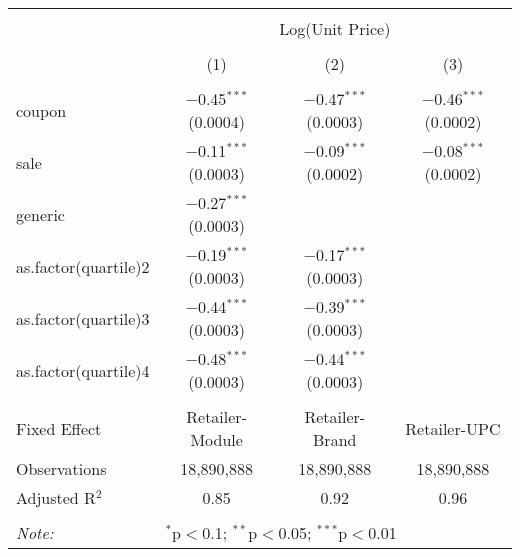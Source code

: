 
\begin{table}[!htbp] \centering 
  \caption{} 
  \label{tab:overallSavingsNonStorable} 
\begin{tabular}{@{\extracolsep{5pt}}lccc} 
\\[-1.8ex]\hline 
\hline \\[-1.8ex] 
 & \multicolumn{3}{c}{Log(Unit Price)} \\ 
\\[-1.8ex] & (1) & (2) & (3)\\ 
\hline \\[-1.8ex] 
 coupon & $-$0.45$^{***}$ (0.0004) & $-$0.47$^{***}$ (0.0003) & $-$0.46$^{***}$ (0.0002) \\ 
  sale & $-$0.11$^{***}$ (0.0003) & $-$0.09$^{***}$ (0.0002) & $-$0.08$^{***}$ (0.0002) \\ 
  generic & $-$0.27$^{***}$ (0.0003) &  &  \\ 
  as.factor(quartile)2 & $-$0.19$^{***}$ (0.0003) & $-$0.17$^{***}$ (0.0003) &  \\ 
  as.factor(quartile)3 & $-$0.44$^{***}$ (0.0003) & $-$0.39$^{***}$ (0.0003) &  \\ 
  as.factor(quartile)4 & $-$0.48$^{***}$ (0.0003) & $-$0.44$^{***}$ (0.0003) &  \\ 
 \hline \\[-1.8ex] 
Fixed Effect & Retailer-Module & Retailer-Brand & Retailer-UPC \\ 
Observations & 18,890,888 & 18,890,888 & 18,890,888 \\ 
Adjusted R$^{2}$ & 0.85 & 0.92 & 0.96 \\ 
\hline 
\hline \\[-1.8ex] 
\textit{Note:}  & \multicolumn{3}{l}{$^{*}$p$<$0.1; $^{**}$p$<$0.05; $^{***}$p$<$0.01} \\ 
\end{tabular} 
\end{table} 

